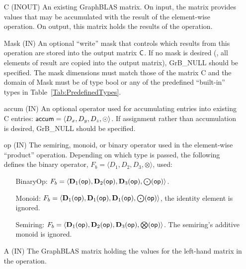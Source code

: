 \begin{itemize}[leftmargin=1.1in]
    \item[{\sf C}]    ({\sf INOUT}) An existing GraphBLAS matrix.  On input,
    the matrix provides values that may be accumulated with the result of the
    element-wise operation.  On output, this matrix holds the results of the
    operation.
    
    \item[{\sf Mask}]  ({\sf IN}) An optional ``write'' mask that controls which
    results from this operation are stored into the output matrix
    ${\sf C}$.  If no mask is desired (\ie, all elements
    of result are copied into the output matrix), {\sf GrB\_NULL}
    should be specified. The mask dimensions must match those of the
    matrix {\sf C} and the domain of {\sf Mask} must be
    of type {\sf bool} or any of the predefined ``built-in'' types in
    Table~\ref{Tab:PredefinedTypes}.

    \item[{\sf accum}] ({\sf IN}) An optional operator used for accumulating
    entries into existing {\sf C} entries: ${\sf accum} = \langle D_x,
    D_y, D_z,\odot \rangle$. If assignment rather than accumulation is
    desired, {\sf GrB\_NULL} should be specified.

    \item[{\sf op}]    ({\sf IN}) The semiring, monoid, or binary operator 
    used in the element-wise ``product'' operation.  Depending on which type is
    passed, the following defines the binary operator, $F_b=\langle D_1,D_2,D_3,\otimes\rangle$, used:
    \begin{itemize}[leftmargin=1.1in]
    \item[BinaryOp:] $F_b = \langle \bold{D}_1({\sf op}), \bold{D}_2({\sf op}),
    \bold{D}_3({\sf op}),\bold{\bigodot}({\sf op})\rangle$.  
    \item[Monoid:] $F_b = \langle \bold{D}_1({\sf op}), \bold{D}_1({\sf op}),
    \bold{D}_1({\sf op}),\bold{\bigodot}({\sf op})\rangle$,
    the identity element is ignored. 
    \item[Semiring:] $F_b = \langle \bold{D}_1({\sf op}), \bold{D}_2({\sf op}),
    \bold{D}_3({\sf op}),\bold{\bigotimes}({\sf op})\rangle$.  The semiring's
    additive monoid is ignored.
    \end{itemize}
    
    \item[{\sf A}]     ({\sf IN}) The GraphBLAS matrix holding the values for
    the left-hand matrix in the operation.
    

\end{itemize}
